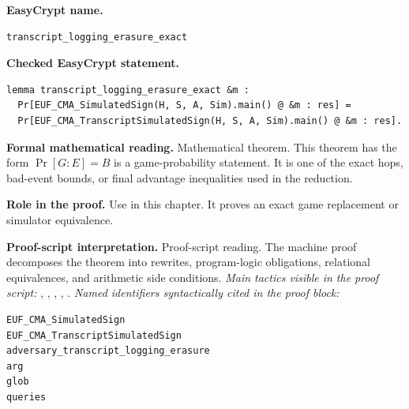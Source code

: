\begin{formaltheorem}
\noindent\textbf{EasyCrypt name.}
\begin{lstlisting}[language=EasyCrypt,basicstyle=\ttfamily\scriptsize]
transcript_logging_erasure_exact
\end{lstlisting}
\noindent\textbf{Checked EasyCrypt statement.}
\begin{lstlisting}[language=EasyCrypt,basicstyle=\ttfamily\scriptsize]
lemma transcript_logging_erasure_exact &m :
  Pr[EUF_CMA_SimulatedSign(H, S, A, Sim).main() @ &m : res] =
  Pr[EUF_CMA_TranscriptSimulatedSign(H, S, A, Sim).main() @ &m : res].
\end{lstlisting}
\noindent\textbf{Formal mathematical reading.}
Mathematical theorem. This theorem has the form \(\Pr[G:E] = B\) is a game-probability statement.  It is one of the exact hops, bad-event bounds, or final advantage inequalities used in the reduction.

\noindent\textbf{Role in the proof.}
Use in this chapter. It proves an exact game replacement or simulator equivalence.

\noindent\textbf{Proof-script interpretation.}
Proof-script reading. The machine proof decomposes the theorem into rewrites, program-logic obligations, relational equivalences, and arithmetic side conditions.
\emph{Main tactics visible in the proof script:} , , , , .
\emph{Named identifiers syntactically cited in the proof block:}
\begin{lstlisting}[language=EasyCrypt,basicstyle=\ttfamily\scriptsize]
EUF_CMA_SimulatedSign
EUF_CMA_TranscriptSimulatedSign
adversary_transcript_logging_erasure
arg
glob
queries
\end{lstlisting}

\end{formaltheorem}

